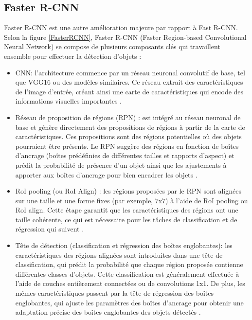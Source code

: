 \subsection{Faster R-CNN}
Faster R-CNN est une autre amélioration majeure par rapport à Fast R-CNN. Selon la figure \ref{FasterRCNN}, Faster R-CNN (Faster Region-based Convolutional Neural Network) \cite{ren2015faster} se compose de plusieurs composants clés qui travaillent ensemble pour effectuer la détection d'objets :
\begin{itemize}
    \item CNN: l'architecture commence par un réseau neuronal convolutif de base, tel que VGG16 ou des modèles similaires. Ce réseau extrait des caractéristiques de l'image d'entrée, créant ainsi une carte de caractéristiques qui encode des informations visuelles importantes \cite{ch2_The5Comp69}.
    \item Réseau de proposition de régions (RPN) : est intégré au réseau neuronal de base et génère directement des propositions de régions à partir de la carte de caractéristiques. Ces propositions sont des régions potentielles où des objets pourraient être présents. Le RPN suggère des régions en fonction de boîtes d'ancrage (boîtes prédéfinies de différentes tailles et rapports d'aspect) et prédit la probabilité de présence d'un objet ainsi que les ajustements à apporter aux boîtes d'ancrage pour bien encadrer les objets \cite{ch2_The5Comp69}.
    \item RoI pooling (ou RoI Align) : les régions proposées par le RPN sont alignées sur une taille et une forme fixes (par exemple, 7x7) à l'aide de RoI pooling ou RoI align. Cette étape garantit que les caractéristiques des régions ont une taille cohérente, ce qui est nécessaire pour les tâches de classification et de régression qui suivent \cite{ch2_The5Comp69}.
    \item Tête de détection (classification et régression des boîtes englobantes): les caractéristiques des régions alignées sont introduites dans une tête de classification, qui prédit la probabilité que chaque région proposée contienne différentes classes d'objets. Cette classification est généralement effectuée à l'aide de couches entièrement connectées ou de convolutions 1x1.
    De plus, les mêmes caractéristiques passent par la tête de régression des boîtes englobantes, qui ajuste les paramètres des boîtes d'ancrage pour obtenir une adaptation précise des boîtes englobantes des objets détectés \cite{ch2_The5Comp69}.  
\end{itemize}

